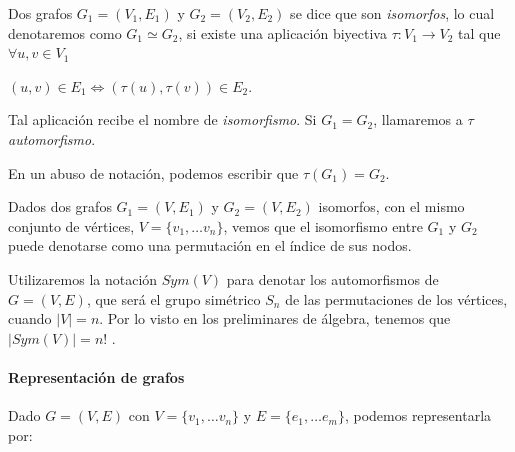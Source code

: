 \begin{definition}
	Dos grafos $G_1 = (V_1, E_1)$ y $G_2 = (V_2, E_2)$ se dice que son \textit{isomorfos}, lo cual denotaremos como $G_1 \simeq G_2$, si existe una aplicación biyectiva $\tau : V_1 \rightarrow V_2$ tal que $\forall u,v \in V_1$
	
	\begin{center}
		$(u,v) \in E_1 \Leftrightarrow (\tau(u), \tau(v)) \in E_2 $.
	\end{center}
	
	Tal aplicación recibe el nombre de \textit{isomorfismo}. Si $G_1 = G_2$, llamaremos a $\tau$ \textit{automorfismo}.
\end{definition}

En un abuso de notación, podemos escribir que $\tau(G_1) = G_2$.


\hfil

Dados dos grafos $G_1 = (V, E_1)$ y $G_2 = (V, E_2)$ isomorfos, con el mismo conjunto de vértices, $V=\{v_1,\dots v_n\}$, vemos que el isomorfismo entre $G_1$ y $G_2$ puede denotarse como una permutación en el índice de sus nodos.

Utilizaremos la notación $Sym(V)$ para denotar los automorfismos de $G=(V,E)$, que será el grupo simétrico $S_n$ de las permutaciones de los vértices, cuando $\mid V \mid=n$. Por lo visto en los preliminares de álgebra, tenemos que $\mid Sym(V) \mid = n!$ .


\hfil

\paragraph{Representación de grafos}

\hfil

Dado $G=(V,E)$ con $V=\{v_1,\dots v_n\}$ y $E=\{e_1,\dots e_m\}$, podemos representarla por:

